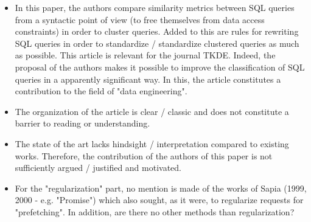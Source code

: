
\begin{itemize}

\item In this paper, the authors compare similarity metrics between SQL queries from a syntactic point of view (to free themselves from data access constraints) in order to cluster queries. Added to this are rules for rewriting SQL queries in order to standardize / standardize clustered queries as much as possible.
This article is relevant for the journal TKDE. Indeed, the proposal of the authors makes it possible to improve the classification of SQL queries in a apparently significant way. In this, the article constitutes a contribution to the field of "data engineering".


\item The organization of the article is clear / classic and does not constitute a barrier to reading or understanding.


\item The state of the art lacks hindsight / interpretation compared to existing works. Therefore, the contribution of the authors of this paper is not sufficiently argued / justified and motivated.


\item For the "regularization" part, no mention is made of the works of Sapia (1999, 2000 - e.g. "Promise") which also sought, as it were, to regularize requests for "prefetching". In addition, are there no other methods than regularization?



\end{itemize}
